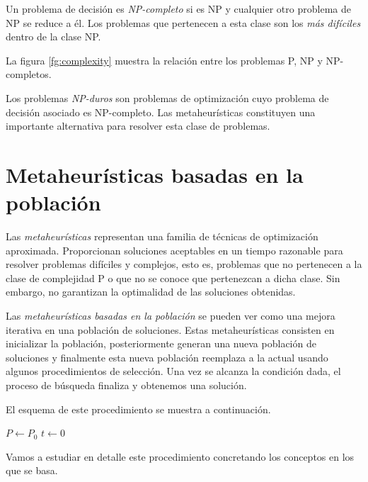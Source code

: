 Un problema de decisión es \emph{NP-completo} si es NP y cualquier otro problema de NP se reduce a él. Los problemas que pertenecen a esta clase son los \emph{más difíciles} dentro de la clase NP.

La figura \ref{fg:complexity} muestra la relación entre los problemas P, NP y NP-completos.

Los problemas \emph{NP-duros} son problemas de optimización cuyo problema de decisión asociado es NP-completo. Las metaheurísticas constituyen una importante alternativa para resolver esta clase de problemas.

\section{Metaheurísticas basadas en la población}

Las \emph{metaheurísticas} representan una familia de técnicas de optimización aproximada. Proporcionan soluciones aceptables en un tiempo razonable para resolver problemas difíciles y complejos, esto es, problemas que no pertenecen a la clase de complejidad P o que no se conoce que pertenezcan a dicha clase. Sin embargo, no garantizan la optimalidad de las soluciones obtenidas.

Las \emph{metaheurísticas basadas en la población} se pueden ver como una mejora iterativa en una población de soluciones. Estas metaheurísticas consisten en inicializar la población, posteriormente generan una nueva población de soluciones y finalmente esta nueva población reemplaza a la actual usando algunos procedimientos de selección. Una vez se alcanza la condición dada, el proceso de búsqueda finaliza y obtenemos una solución.

El esquema de este procedimiento se muestra a continuación.

\begin{Ualgorithm}[H]
    \small
    \DontPrintSemicolon
    $P \longleftarrow P_0$ 
    $t \longleftarrow 0$\;
\end{Ualgorithm}

Vamos a estudiar en detalle este procedimiento concretando los conceptos en los que se basa.

